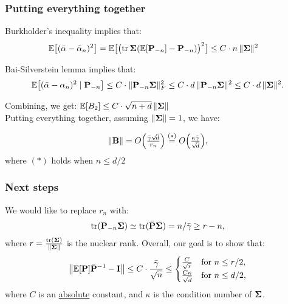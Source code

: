 \documentclass[10pt]{beamer}
\begin{document}
\begin{frame}
  \frametitle{Putting everything together}
  Burkholder's inequality implies that:
  \begin{align*}
    \mathbb E\big[(\bar\alpha-\tilde\alpha_n)^2\big]
    &= \mathbb E\big[\big(\mathrm{tr}\,\mathbf{\Sigma}(\mathbb E[\mathbf P_{-n}]-\mathbf P_{-n})\big)^2\big] \leq C\cdot n\, \|\mathbf{\Sigma}\|^2
  \end{align*}
  \vspace{5mm}
  
Bai-Silverstein lemma implies
that: 
  \begin{align*}
\mathbb E\big[(\tilde\alpha-\alpha_n)^2\mid\mathbf P_{-n}\big] \leq C\cdot
    \|\mathbf P_{-n}\mathbf{\Sigma}\|_F^2\leq C\cdot d\,\|\mathbf P_{-n}\mathbf{\Sigma}\|^2\leq
    C\cdot d\,\|\mathbf{\Sigma}\|^2.
  \end{align*}
  \vspace{5mm}
  
  Combining, we get:   $\mathbb E[B_2] \leq C\cdot \sqrt{n+d}\,\|\mathbf{\Sigma}\|$\\
  Putting everything together, assuming $\|\mathbf{\Sigma}\|=1$, we have:

  \begin{align*}
    \|\mathbf B\|=O\Big(\tfrac{\bar\gamma\sqrt{\!d}}{r_n}\Big)\overset{(*)}{=}
O\Big(\tfrac{\kappa\bar\gamma}{\sqrt{\!d}}\Big),
  \end{align*}
  where $(*)$ holds when $n\leq d/2$
\end{frame}

\begin{frame}
  \frametitle{Next steps}

  We would like to replace $r_n$ with:
  \begin{align*}
\mathrm{tr}(\mathbf P_{-n}\mathbf{\Sigma})\simeq
\mathrm{tr}(\bar{\mathbf P}\mathbf{\Sigma}) =n/\bar\gamma \geq r-n,
  \end{align*}
  where $r=\frac{\mathrm{tr}(\mathbf{\Sigma})}{\|\mathbf{\Sigma}\|}$ is the nuclear
  rank. Overall, our goal is to show that:
  \begin{align*}
    \big\|\mathbb E[\mathbf P]\bar{\mathbf P}^{-1}-\mathbf I\big\| \leq
    C\cdot\frac{\bar\gamma}{\sqrt{n}}
\leq
    \begin{cases}
      \frac C{\sqrt r} &\text{for }n\leq r/2,\\
      \frac {C\kappa}{\sqrt d} &\text{for }n\leq d/2,
    \end{cases}  
  \end{align*}
  where $C$ is an \underline{absolute} constant, and $\kappa$ is the
  condition number of $\mathbf{\Sigma}$.
\end{frame}
\end{document}
